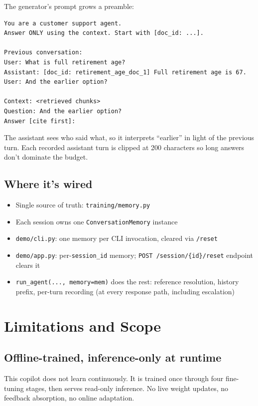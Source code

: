 \documentclass[11pt,a4paper]{article}
\begin{document}
The generator's prompt grows a preamble:

\begin{lstlisting}[basicstyle=\ttfamily\footnotesize]
You are a customer support agent.
Answer ONLY using the context. Start with [doc_id: ...].

Previous conversation:
User: What is full retirement age?
Assistant: [doc_id: retirement_age_doc_1] Full retirement age is 67.
User: And the earlier option?

Context: <retrieved chunks>
Question: And the earlier option?
Answer [cite first]:
\end{lstlisting}

The assistant sees who said what, so it interprets ``earlier'' in light of the previous turn. Each recorded assistant turn is clipped at 200 characters so long answers don't dominate the budget.

\subsection{Where it's wired}

\begin{itemize}[leftmargin=*, itemsep=1pt]
\item Single source of truth: \texttt{training/memory.py}
\item Each session owns one \texttt{ConversationMemory} instance
\item \texttt{demo/cli.py}: one memory per CLI invocation, cleared via \texttt{/reset}
\item \texttt{demo/app.py}: per-\texttt{session\_id} memory; \texttt{POST /session/\{id\}/reset} endpoint clears it
\item \texttt{run\_agent(..., memory=mem)} does the rest: reference resolution, history prefix, per-turn recording (at every response path, including escalation)
\end{itemize}

\clearpage
\section{Limitations and Scope}

\subsection{Offline-trained, inference-only at runtime}

\begin{keyidea}
This copilot does not learn continuously. It is trained once through four fine-tuning stages, then serves read-only inference. No live weight updates, no feedback absorption, no online adaptation.
\end{keyidea}
\end{document}
